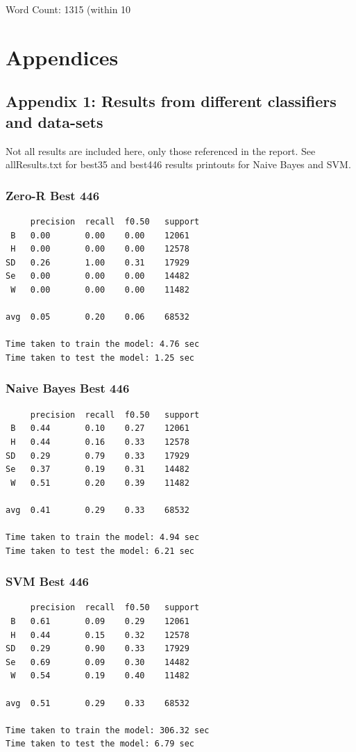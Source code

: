 \documentclass[twocolumn]{article}
\begin{document}
\hfill \break

\noindent Word Count: 1315 (within 10%

\vfill\eject
\printbibliography
\clearpage
\section{Appendices}
\subsection{Appendix 1: Results from different classifiers and data-sets}
Not all results are included here, only those referenced in the report. See allResults.txt for best35 and best446 results printouts for Naive Bayes and SVM.
\subsubsection{Zero-R Best 446}
\begin{verbatim}
     precision  recall  f0.50   support
 B   0.00       0.00    0.00    12061
 H   0.00       0.00    0.00    12578
SD   0.26       1.00    0.31    17929
Se   0.00       0.00    0.00    14482
 W   0.00       0.00    0.00    11482

avg  0.05       0.20    0.06    68532

Time taken to train the model: 4.76 sec
Time taken to test the model: 1.25 sec
\end{verbatim}
\subsubsection{Naive Bayes Best 446}
\begin{verbatim}
     precision  recall  f0.50   support
 B   0.44       0.10    0.27    12061
 H   0.44       0.16    0.33    12578
SD   0.29       0.79    0.33    17929
Se   0.37       0.19    0.31    14482
 W   0.51       0.20    0.39    11482

avg  0.41       0.29    0.33    68532

Time taken to train the model: 4.94 sec
Time taken to test the model: 6.21 sec
\end{verbatim}
\vfill\eject
\subsubsection{SVM Best 446}
\begin{verbatim}
     precision  recall  f0.50   support
 B   0.61       0.09    0.29    12061
 H   0.44       0.15    0.32    12578
SD   0.29       0.90    0.33    17929
Se   0.69       0.09    0.30    14482
 W   0.54       0.19    0.40    11482

avg  0.51       0.29    0.33    68532

Time taken to train the model: 306.32 sec
Time taken to test the model: 6.79 sec
\end{verbatim}
\end{document}
